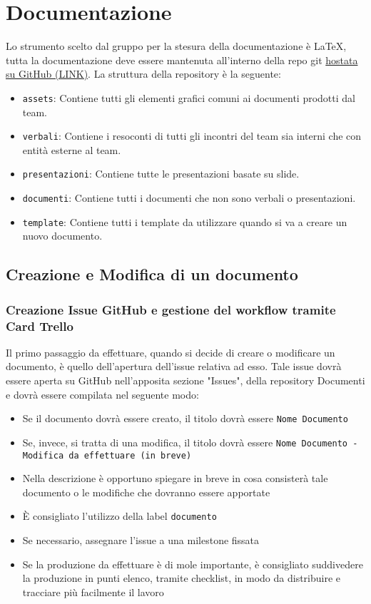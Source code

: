 \section{Documentazione}

Lo strumento scelto dal gruppo per la stesura della documentazione è \LaTeX,
tutta la documentazione deve essere mantenuta all'interno della repo git
\href{https://github.com/Club-Swendwich/Documenti}{hostata su GitHub (LINK)}.
La struttura della repository è la seguente:
\begin{itemize}
    \item \texttt{assets}: Contiene tutti gli elementi grafici comuni ai documenti
        prodotti dal team.
    \item \texttt{verbali}: Contiene i resoconti di tutti gli incontri del team sia
        interni che con entità esterne al team.
    \item \texttt{presentazioni}: Contiene tutte le presentazioni basate su slide.
    \item \texttt{documenti}: Contiene tutti i documenti che non sono verbali o
        presentazioni.
    \item \texttt{template}: Contiene tutti i template da utilizzare quando si va a
        creare un nuovo documento.
\end{itemize}

\subsection{Creazione e Modifica di un documento}

\subsubsection{Creazione Issue GitHub e gestione del workflow tramite Card Trello}
Il primo passaggio da effettuare, quando si decide di creare o modificare un documento, è quello dell'apertura dell'issue relativa ad esso.
Tale issue dovrà essere aperta su GitHub nell'apposita sezione "Issues", della repository Documenti e dovrà essere compilata nel seguente modo:
\begin{itemize}
    \item Se il documento dovrà essere creato, il titolo dovrà essere
    \texttt{Nome Documento}
    \item Se, invece, si tratta di una modifica, il titolo dovrà essere
    \texttt{Nome Documento - Modifica da effettuare (in breve)}
    \item Nella descrizione è opportuno spiegare in breve in cosa consisterà tale documento o le modifiche che dovranno essere apportate
    \item È consigliato l'utilizzo della label \texttt{documento}
    \item Se necessario, assegnare l'issue a una milestone fissata
    \item Se la produzione da effettuare è di mole importante, è consigliato suddivedere la produzione in punti elenco, tramite checklist, in modo da distribuire e tracciare più facilmente il lavoro
\end{itemize}

